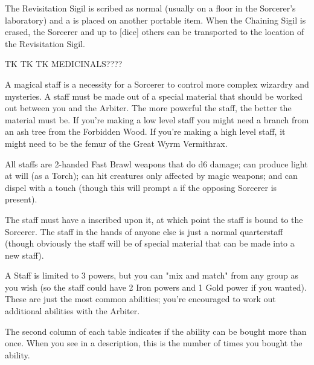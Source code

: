 {

The Revisitation Sigil is scribed as normal (usually on a floor in the Sorcerer's laboratory) and a  is placed on another portable item.  When the Chaining Sigil is erased, the Sorcerer and up to [dice] others can be transported to the location of the Revisitation Sigil.  


TK TK TK MEDICINALS????




A magical staff is a necessity for a Sorcerer to control more complex wizardry and mysteries.  A staff must be made out of a special material that should be worked out between you and the Arbiter.  The more powerful the staff, the better the material must be.  If you're making a low level staff you might need a branch from an ash tree from the Forbidden Wood.  If you're making a high level staff, it might need to be the femur of the Great Wyrm Vermithrax.  

All staffs are 2-handed Fast Brawl weapons that do d6 damage; can produce light at will (as a Torch); can hit creatures only affected by magic weapons; and can dispel  with a touch (though this will  prompt a  if the opposing Sorcerer is present).

The staff must have a  inscribed upon it, at which point the staff is bound to the Sorcerer. The staff in the hands of anyone else is just a normal quarterstaff (though obviously the staff will be of special material that can be made into a new staff). 

A Staff is limited to 3 powers, but you can "mix and match" from any group as you wish (so the staff could have 2 Iron powers and 1 Gold power if you wanted). These are just the most common abilities; you're encouraged to work out additional abilities with the Arbiter.

The second column of each table indicates if the ability can be bought more than once.  When you see \mybold{[num]} in a description, this is the number of times you bought the ability.

}

